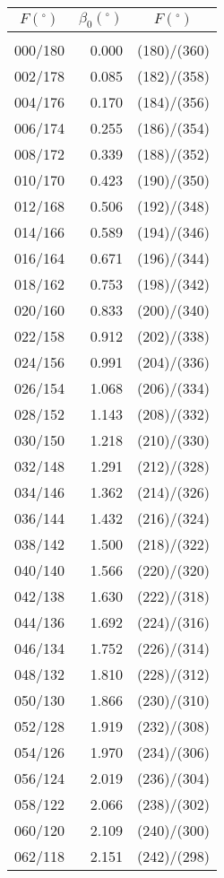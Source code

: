 \newpage
\begin{table}\centering
\small{ \begin{tabular}{crc}
$F (^\circ)$ & $\beta_0(^\circ)$ &
$F (^\circ)$ \\\hline
&&\\[-1.75ex]
000/180 &  0.000 & (180)/(360)\\
002/178 &  0.085 & (182)/(358)\\
004/176 &  0.170 & (184)/(356)\\
006/174 &  0.255 & (186)/(354)\\
008/172 &  0.339 & (188)/(352)\\
010/170 &  0.423 & (190)/(350)\\
012/168 &  0.506 & (192)/(348)\\
014/166 &  0.589 & (194)/(346)\\
016/164 &  0.671 & (196)/(344)\\
018/162 &  0.753 & (198)/(342)\\
020/160 &  0.833 & (200)/(340)\\
022/158 &  0.912 & (202)/(338)\\
024/156 &  0.991 & (204)/(336)\\
026/154 &  1.068 & (206)/(334)\\
028/152 &  1.143 & (208)/(332)\\
030/150 &  1.218 & (210)/(330)\\
032/148 &  1.291 & (212)/(328)\\
034/146 &  1.362 & (214)/(326)\\
036/144 &  1.432 & (216)/(324)\\
038/142 &  1.500 & (218)/(322)\\
040/140 &  1.566 & (220)/(320)\\
042/138 &  1.630 & (222)/(318)\\
044/136 &  1.692 & (224)/(316)\\
046/134 &  1.752 & (226)/(314)\\
048/132 &  1.810 & (228)/(312)\\
050/130 &  1.866 & (230)/(310)\\
052/128 &  1.919 & (232)/(308)\\
054/126 &  1.970 & (234)/(306)\\
056/124 &  2.019 & (236)/(304)\\
058/122 &  2.066 & (238)/(302)\\
060/120 &  2.109 & (240)/(300)\\
062/118 &  2.151 & (242)/(298)\\

\end{tabular}}
\end{table}
